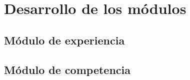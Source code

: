 
\chapter{Desarrollo de los módulos}\label{mod:concentrado}

    \section{Módulo de experiencia}\label{mod:exp}
    

    \section{Módulo de competencia}\label{mod:comp}
    





